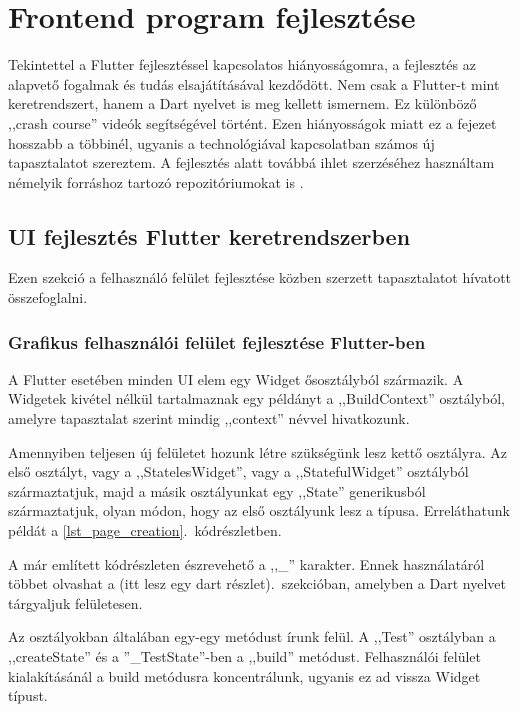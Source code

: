 \documentclass{thesis-ekf}
\theoremstyle{definition}
\theoremstyle{remark}
\begin{document}
	\chapter{Frontend program fejlesztése}
	Tekintettel a Flutter fejlesztéssel kapcsolatos hiányosságomra, a fejlesztés az alapvető fogalmak és tudás elsajátításával kezdődött. Nem csak a Flutter-t mint keretrendszert, hanem a Dart nyelvet is meg kellett ismernem. Ez különböző ,,crash course'' videók segítségével  történt\cite{bib_flutter_fireship,bib_flutter_traversy,bib_flutter_freecodecamp}. Ezen hiányosságok miatt ez a fejezet hosszabb a többinél, ugyanis a technológiával kapcsolatban számos új tapasztalatot szereztem.  A fejlesztés alatt továbbá ihlet szerzéséhez használtam némelyik forráshoz tartozó repozitóriumokat is \cite{bib_flutter_freecodecamp_repo,bib_flutter_traversy_repo}.
	\section{UI fejlesztés Flutter keretrendszerben}
	Ezen szekció a felhasználó felület fejlesztése közben szerzett tapasztalatot hívatott összefoglalni.
	\subsection{Grafikus felhasználói felület fejlesztése Flutter-ben}
	A Flutter esetében minden UI elem egy Widget ősosztályból származik. A Widgetek kivétel nélkül tartalmaznak egy példányt a  ,,BuildContext'' osztályból, amelyre tapasztalat szerint mindig ,,context'' névvel hivatkozunk.
	
	Amennyiben teljesen új felületet hozunk létre szükségünk lesz kettő osztályra. Az első osztályt, vagy a ,,StatelesWidget'', vagy a ,,StatefulWidget'' osztályból származtatjuk, majd a másik osztályunkat egy ,,State'' generikusból származtatjuk, olyan módon, hogy az első osztályunk lesz a típusa. Erreláthatunk példát a \ref{lst_page_creation}.~kódrészletben.
	
	A már említett kódrészleten észrevehető a ,,\_'' karakter. Ennek használatáról többet olvashat a (itt lesz egy dart részlet).~szekcióban, amelyben a Dart nyelvet tárgyaljuk felületesen.
	
	Az osztályokban általában egy-egy metódust írunk felül. A ,,Test'' osztályban a ,,createState'' és a ''\_TestState''-ben a ,,build'' metódust. Felhasználói felület kialakításánál a build metódusra koncentrálunk, ugyanis ez ad vissza Widget típust.
	
\end{document}

